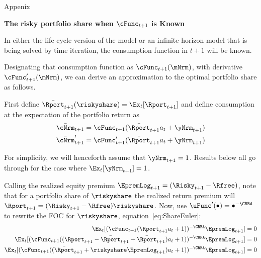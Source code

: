 \documentclass{\econtex}
\begin{document}
\pagebreak
\centerline{\Large Appenix}
\appendix
\medskip\medskip
\centerline{\textbf{\Large The risky portfolio share when $\cFunc_{t+1}$ is Known}}
\medskip\medskip

In either the life cycle version of the model or an infinite horizon model that is being solved by time iteration, the consumption function in $t+1$ will be known.

Designating that consumption function as $\cFunc_{t+1}(\mNrm)$, with derivative $\cFunc^{\prime}_{t+1}(\mNrm)$, we can derive an approximation to the optimal portfolio share as follows.

\newcommand{\ERport}{\bar{\Rport}}
\newcommand{\cNxt}{\bar{\cFunc}_{t+1}}
\newcommand{\orderTwo}{+(1/2)(\riskyshare\EpremLog_{t+1}{a}_{t})^{2}\cFunc^{\prime\prime}_{t+1}}
\renewcommand{\orderTwo}{}

First define $\ERport_{t+1}(\riskyshare)=\Ex_{t}[\Rport_{t+1}]$ and define consumption at the expectation of the portfolio return as
\begin{align*}
\bar{\cNrm}_{t+1} &= \cFunc_{t+1}(\ERport_{t+1}{a}_{t} + \yNrm_{t+1})
\\ \bar{\cNrm}^{\prime}_{t+1}& = \cFunc_{t+1}^{\prime}(\ERport_{t+1}{a}_{t} + \yNrm_{t+1})
\end{align*}

For simplicity, we will henceforth assume that $\yNrm_{t+1}=1$.  Results below all go through for the case where $\Ex_{t}[\yNrm_{t+1}]=1$.

Calling the realized equity premium $\EpremLog_{t+1}=(\Risky_{t+1}-\Rfree)$, note that for a portfolio share of $\riskyshare$ the realized return premium will $\Rport_{t+1}=(\Risky_{t+1}-\Rfree)\riskyshare$.  Now, use $\uFunc^{\prime}(\bullet)=\bullet^{-\CRRA}$ to rewrite the FOC for $\riskyshare$, equation~\eqref{eq:ShareEuler}:
\begin{equation}\begin{gathered}\begin{aligned}
      \Ex_{t}[(\cFunc_{t+1}(\Rport_{t+1}{a}_{t}+1))^{-\CRRA}\EpremLog_{t+1}] & =  0 \label{eq:ShareEulernewnew}
      \\ \Ex_{t}[(\cFunc_{t+1}((\Rport_{t+1}-\ERport_{t+1}+\ERport_{t+1}){a}_{t}+1))^{-\CRRA}\EpremLog_{t+1}] & =  0
      \\ \Ex_{t}[(\cFunc_{t+1}((\ERport_{t+1}+\riskyshare\EpremLog_{t+1}){a}_{t}+1))^{-\CRRA}\EpremLog_{t+1}] & =  0
\end{aligned}\end{gathered}\end{equation}
\end{document}

